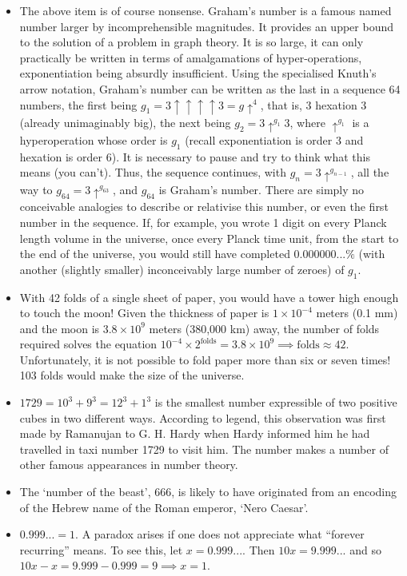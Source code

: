 \documentclass[11pt]{amsart}
\begin{document}
\begin{itemize}
\item The above item is of course nonsense. Graham's number is a famous named number larger by incomprehensible magnitudes. It provides an upper bound to the solution of a problem in graph theory. It is so large, it can only practically be written in terms of amalgamations of hyper-operations, exponentiation being absurdly insufficient. Using the specialised Knuth's arrow notation, Graham's number can be written as the last in a sequence 64 numbers, the first being $g_1 = 3\uparrow\uparrow\uparrow\uparrow3 = g\uparrow^4$, that is, 3 hexation 3 (already unimaginably big), the next being $g_2 = 3\uparrow^{g_1}3$, where $\uparrow^{g_1}$ is a hyperoperation whose order is $g_1$ (recall exponentiation is order 3 and hexation is order 6). It is necessary to pause and try to think what this means (you can't). Thus, the sequence continues, with $g_n = 3\uparrow^{g_{n-1}}$, all the way to $g_{64} = 3\uparrow^{g_{63}}$, and $g_{64}$ is Graham's number.
There are simply no conceivable analogies to describe or relativise this number, or even the first number in the sequence. If, for example, you wrote 1 digit on every Planck length volume in the universe, once every Planck time unit, from the start to the end of the universe, you would still have completed $0.000000...\%$ (with another (slightly smaller) inconceivably large number of zeroes) of $g_1$.
\item With 42 folds of a single sheet of paper, you would have a tower high enough to touch the moon! Given the thickness of paper is $1 \times 10^{-4}$ meters (0.1 mm) and the moon is $3.8 \times 10^{9}$ meters (380,000 km) away, the number of folds required solves the equation $10^{-4}\times 2^{\text{folds}} = 3.8\times10^9 \implies \text{folds} \approx 42$. Unfortunately, it is not possible to fold paper more than six or seven times! 103 folds would make the size of the universe.
\item $1729 = 10^3 + 9^3 = 12^3 + 1^3$ is the smallest number expressible of two positive cubes in two different ways. According to legend, this observation was first made by Ramanujan to G. H. Hardy when Hardy informed him he had travelled in taxi number 1729 to visit him. The number makes a number of other famous appearances in number theory.
\item The `number of the beast', 666, is likely to have originated from an encoding of the Hebrew name of the Roman emperor, `Nero Caesar'.
\item $0.999... = 1$. A paradox arises if one does not appreciate what ``forever recurring'' means. To see this, let $x = 0.999...$. Then $10x = 9.999...$ and so $10x - x = 9.999 - 0.999 = 9 \implies x = 1$.

\end{itemize}
\end{document}
